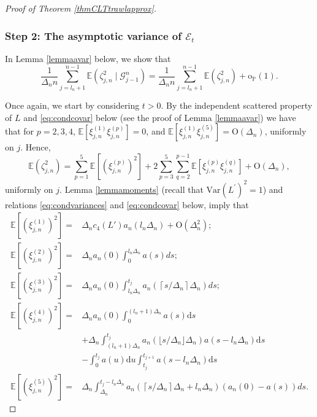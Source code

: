 \documentclass{article}
\theoremstyle{plain}
\theoremstyle{definition}
\theoremstyle{remark}
\begin{document}
\begin{appendix}
\begin{proof}[Proof of Theorem  \ref{thmCLTtrawlapprox}]
	\subsubsection*{Step 2: The asymptotic variance of $\mathcal{E}_{t}$}

   
	In Lemma \ref{lemmaavar} below, we show that
	\begin{equation}\label{approxAVAR}
		\frac{1}{\Delta_{n}n}\sum_{j=l_{n}+1}^{n-1}\mathbb{E}(\zeta_{j,n}^{2}\mid\mathscr{G}_{j-1}^{n})=\frac{1}{\Delta_{n}n}\sum_{j=l_{n}+1}^{n-1}\mathbb{E}(\zeta_{j,n}^{2})+\mathrm{o}_{\mathbb{P}}(1).
	\end{equation}
	
	
	Once again, we start by considering $t>0$. By the independent scattered
	property of $L$ and \eqref{eq:condcovar} below (see the proof of Lemma \ref{lemmaavar}) we have that for $p=2,3,4$, $\mathbb{E}[\xi_{j,n}^{(1)}\xi_{j,n}^{(p)}]=0$, and $\mathbb{E}[\xi_{j,n}^{(1)}\xi_{j,n}^{(5)}]=\mathrm{O}(\Delta_n)$, uniformly on $j$. Hence,
	\[
	\mathbb{E}(\zeta_{j,n}^{2})=\sum_{p=1}^{5}\mathbb{E}[(\xi_{j,n}^{(p)})^{2}]+2\sum_{p=3}^{5}\sum_{q=2}^{p-1}\mathbb{E}[\xi_{j,n}^{(p)}\xi_{j,n}^{(q)}]+\mathrm{O}(\Delta_n),
	\]
uniformly on $j$. Lemma \ref{lemmamoments} (recall that $\mathrm{Var}(L^{\prime})^{2}=1$)
	and relations \eqref{eq:condvariances} and  \eqref{eq:condcovar} below, imply that 
	\begin{equation}
		\begin{aligned}\mathbb{E}[(\xi_{j,n}^{(1)})^{2}]= & \Delta_{n}c_{4}(L')a_{n}(l_{n}\Delta_{n})+\mathrm{O}(\Delta_{n}^{2});\\
			\mathbb{E}[(\xi_{j,n}^{(2)})^{2}]= & \Delta_{n}a_{n}(0)\int_{0}^{l_{n}\Delta_{n}}a(s)ds;\\
			\mathbb{E}[(\xi_{j,n}^{(3)})^{2}]= & \Delta_{n}a_{n}(0)\int_{l_{n}\Delta_{n}}^{t_{j}}a_{n}(\left\lceil s/\Delta_{n}\right\rceil \Delta_{n})ds;\\
			\mathbb{E}[(\xi_{j,n}^{(4)})^{2}]= &\Delta_{n}a_{n}(0)\int_{0}^{(l_{n}+1)\Delta_{n}}a(s)\mathrm{d}s\\
  & +\Delta_{n}\int_{(l_{n}+1)\Delta_{n}}^{t_{j}}a_{n}(\lfloor s/\Delta_{n}\rfloor\Delta_{n})a(s-l_{n}\Delta_{n})\mathrm{d}s\\
  &-\int_{0}^{t_{j}}a(u)\mathrm{d}u\int_{t_{j}}^{t_{j+1}}a(s-l_{n}\Delta_{n})\mathrm{d}s\\
			\mathbb{E}[(\xi_{j,n}^{(5)})^{2}]= & \Delta_{n}\int_{\Delta_{n}}^{t_{j}-l_{n}\Delta_{n}}a_{n}(\left\lceil s/\Delta_{n}\right\rceil \Delta_{n}+l_{n}\Delta_{n})\left(a_{n}(0)-a(s)\right)ds.

\end{aligned}
\end{equation}
\end{proof}
\end{appendix}
\end{document}
